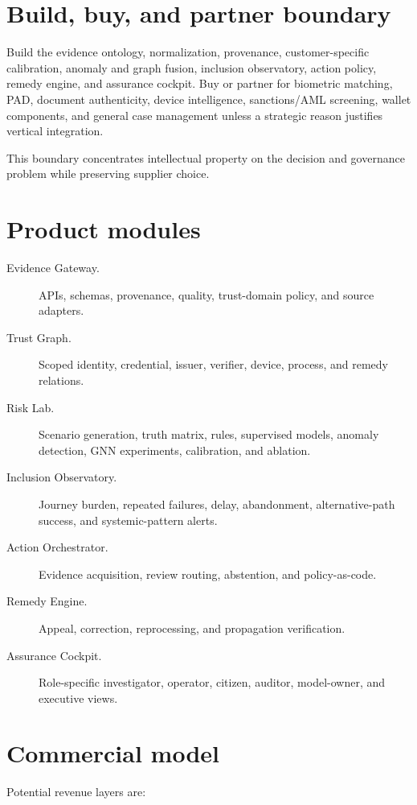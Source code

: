 \section{Build, buy, and partner boundary}

Build the evidence ontology, normalization, provenance, customer-specific calibration, anomaly and graph fusion, inclusion observatory, action policy, remedy engine, and assurance cockpit. Buy or partner for biometric matching, PAD, document authenticity, device intelligence, sanctions/AML screening, wallet components, and general case management unless a strategic reason justifies vertical integration.

This boundary concentrates intellectual property on the decision and governance problem while preserving supplier choice.

\section{Product modules}

\begin{description}
\item[Evidence Gateway.] APIs, schemas, provenance, quality, trust-domain policy, and source adapters.
\item[Trust Graph.] Scoped identity, credential, issuer, verifier, device, process, and remedy relations.
\item[Risk Lab.] Scenario generation, truth matrix, rules, supervised models, anomaly detection, GNN experiments, calibration, and ablation.
\item[Inclusion Observatory.] Journey burden, repeated failures, delay, abandonment, alternative-path success, and systemic-pattern alerts.
\item[Action Orchestrator.] Evidence acquisition, review routing, abstention, and policy-as-code.
\item[Remedy Engine.] Appeal, correction, reprocessing, and propagation verification.
\item[Assurance Cockpit.] Role-specific investigator, operator, citizen, auditor, model-owner, and executive views.
\end{description}

\section{Commercial model}

Potential revenue layers are:

